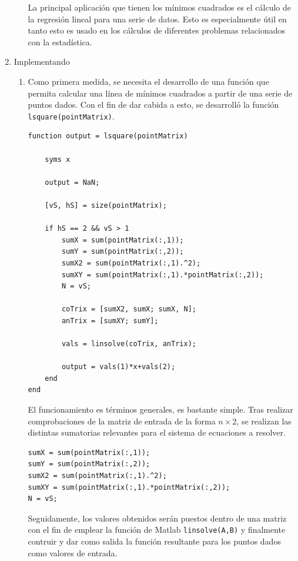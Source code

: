 \documentclass[english,notitlepage,letterpaper, 10pt]{article} %
\begin{document}
\begin{enumerate}
\begin{enumerate}
        La principal aplicación que tienen los mínimos cuadrados es el cálculo de la regresión lineal para una serie de datos. Esto es especialmente útil en tanto esto es usado en los cálculos de diferentes problemas relacionados con la estadística.

    \end{enumerate}

  \item Implementando
  
    \begin{enumerate}
      
      \item Como primera medida, se necesita el desarrollo de una función que permita calcular una línea de mínimos cuadrados a partir de una serie de puntos dados. Con el fin de dar cabida a esto, se desarrolló la función \texttt{lsquare(pointMatrix)}.
      
      \begin{lstlisting}
function output = lsquare(pointMatrix)

    syms x

    output = NaN;

    [vS, hS] = size(pointMatrix);

    if hS == 2 && vS > 1
        sumX = sum(pointMatrix(:,1));
        sumY = sum(pointMatrix(:,2));
        sumX2 = sum(pointMatrix(:,1).^2);
        sumXY = sum(pointMatrix(:,1).*pointMatrix(:,2));
        N = vS;

        coTrix = [sumX2, sumX; sumX, N];
        anTrix = [sumXY; sumY];

        vals = linsolve(coTrix, anTrix);

        output = vals(1)*x+vals(2);
    end
end
      \end{lstlisting}

      El funcionamiento es términos generales, es bastante simple. Tras realizar comprobaciones de la matriz de entrada de la forma $n \times 2$, se realizan las distintas sumatorias relevantes para el sistema de ecuaciones a resolver.

      \begin{lstlisting}
sumX = sum(pointMatrix(:,1));
sumY = sum(pointMatrix(:,2));
sumX2 = sum(pointMatrix(:,1).^2);
sumXY = sum(pointMatrix(:,1).*pointMatrix(:,2));
N = vS;
      \end{lstlisting}

      Seguidamente, los valores obtenidos serán puestos dentro de una matriz con el fin de emplear la función de Matlab \texttt{linsolve(A,B)} y finalmente contruir y dar como salida la función resultante para los puntos dados como valores de entrada.


\end{enumerate}
\end{enumerate}
\end{document}
